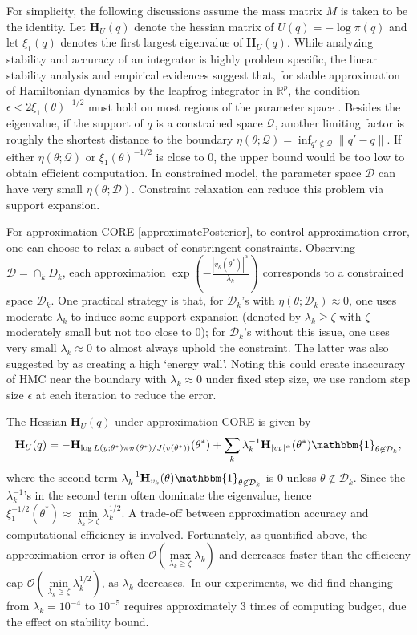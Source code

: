 \documentclass[10pt,fleqn]{article}
\newcommand{\bb}[1]{\mathbb{#1}}
\newcommand{\mc}[1]{\mathcal{#1}}
\DeclareMathOperator{\1}{\mathbbm{1}}
\newcommand{\dt}{\epsilon} %
\newcommand{\mass}{M} %
\newcommand{\hess}{\mathbf{H}} %
\begin{document}
For simplicity, the following discussions assume the mass matrix $\mass$ is taken to be the identity. Let $\hess_U(q)$ denote the hessian matrix of $U(q) = - \log \pi(q)$ and let $\xi_1(q)$ denotes the first largest eigenvalue of $\hess_U(q)$. While analyzing stability and accuracy of an integrator is highly problem specific, the linear stability analysis and empirical evidences suggest that, for stable approximation of Hamiltonian dynamics by the leapfrog integrator in $\bb R^p$, the condition $\dt < 2\xi_1(\theta)^{-1/2}$ must hold on most regions of the parameter space \citep{hairer06}.
Besides the eigenvalue, if the support of $q$ is a constrained space $\mc Q$, another limiting factor is roughly the shortest distance to the boundary $\eta (\theta; {\mc Q})= \inf_{q'\not\in \mc Q}\|q'-q\|$. If either $\eta (\theta; {\mc Q})$ or $\xi_1(\theta)^{-1/2}$ 
is close to $0$, the upper bound would be too low to obtain efficient computation.
In constrained model, the parameter space $\mc D$ can have very small $\eta(\theta;\mc D)$. Constraint relaxation can reduce this problem via support
expansion. 

For approximation-CORE \eqref{approximatePosterior}, to control approximation
error, one can choose to relax a subset of constringent constraints. Observing  $\mc D=\cap_{k} D_k$,
each approximation $\exp(-\frac{|v_k(\theta^*)|^\alpha}{\lambda_k})$ corresponds to a constrained space $\mc D_k$.  One practical strategy is that, for $\mc D_k$'s with $\eta(\theta;\mc D_k)\approx 0$, one uses moderate $\lambda_k$ to induce some support expansion (denoted by $\lambda_k\ge \zeta$ with $\zeta$ moderately small but not too close to $0$);  for $\mc D_k$'s without this issue, one uses very small $\lambda_k\approx 0$ to almost always uphold the constraint.
The latter was also suggested by \cite{neal2011mcmc} as creating a high `energy wall'. Noting this could create  inaccuracy of HMC near the boundary with $\lambda_k\approx 0$ under fixed step size,  we use random step size $\epsilon$ at each iteration to reduce the error.


The Hessian $\hess_U(q)$ under approximation-CORE is given by
\begin{equation}
\label{eq:hessian_extrinsic}
\hess_U(q) = -\hess_{\log L(y;\theta^*) \pi_{\mc
R}(\theta^*) /J(v(\theta^*)) }(\theta^*)+\sum_k \lambda_k^{-1} \hess_{|v_k|^\alpha}(\theta^*) \mathbbm{1}_{\theta\not\in \mc D_k},
\end{equation}
where the second term $\lambda_k^{-1} \hess_{v_k}(\theta) \mathbbm{1}_{\theta\not\in \mc D_k}$ is $0$ unless $\theta\not\in \mc D_k$. Since the $\lambda^{-1}_k$'s
in the second term often dominate the eigenvalue, hence $\xi^{-1/2}_1(\theta^*)\approx
\underset{\lambda_k\ge \zeta}{\min}\lambda_k^{1/2}$. A trade-off between approximation accuracy and computational efficiency is involved. Fortunately, as quantified above, the approximation error is often $\mc O( \underset{\lambda_k\ge \zeta}{\max}\lambda_k)
$ and decreases faster than the efficiceny cap $\mc O( \underset{\lambda_k\ge \zeta}{\min}\lambda_k^{1/2})$, as $\lambda_k$ decreases.\ In our experiments, we did find changing from $\lambda_{k}=10^{-4}$ to $10^{-5}$ requires approximately $3$ times of computing budget, due the effect on stability
bound.
\end{document}
